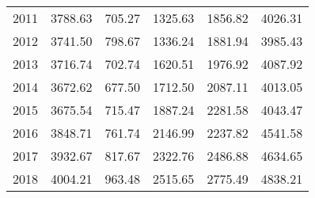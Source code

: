 \begin{center}
\begin{longtable}{|r|c|c|c|c|l|}
	2011 & 3788.63   & 705.27  & 1325.63  & 1856.82  & 4026.31 \\
	2012 & 3741.50   & 798.67  & 1336.24  & 1881.94  & 3985.43 \\
	2013 & 3716.74   & 702.74  & 1620.51  & 1976.92  & 4087.92 \\
	2014 & 3672.62   & 677.50  & 1712.50  & 2087.11  & 4013.05 \\
	2015 & 3675.54   & 715.47  & 1887.24  & 2281.58  & 4043.47 \\
	2016 & 3848.71   & 761.74  & 2146.99  & 2237.82  & 4541.58 \\
	2017 & 3932.67   & 817.67  & 2322.76  & 2486.88  & 4634.65 \\
	2018 & 4004.21   & 963.48  & 2515.65  & 2775.49  & 4838.21 \\ \hline
\end{longtable}
\end{center}

